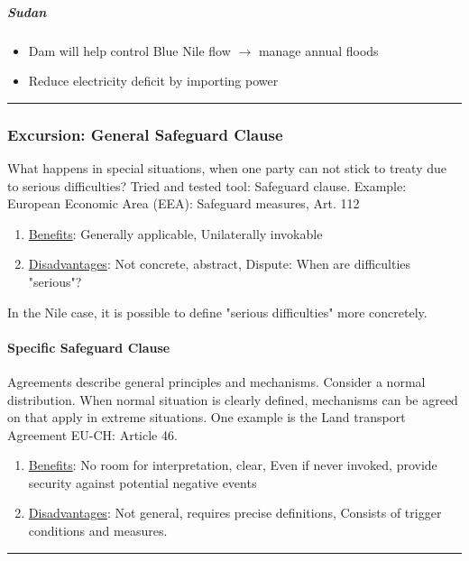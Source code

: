 \subparagraph{Sudan}
\begin{itemize}
    \item Dam will help control Blue Nile flow $\rightarrow$ manage annual floods
    \item Reduce electricity deficit by importing power
\end{itemize}

\pagebreak

\hrule

\subsubsection{Excursion: General Safeguard Clause}

What happens in special situations, when one party can not stick to treaty
due to serious difficulties? Tried and tested tool: Safeguard clause.
Example: European Economic Area (EEA): Safeguard measures, Art. 112

\begin{enumerate}[]
    \item \underline{Benefits}: Generally applicable, Unilaterally invokable
    \item \underline{Disadvantages}: Not concrete, abstract, Dispute: When are difficulties "serious"?
\end{enumerate}
In the Nile case, it is possible to define "serious difficulties" more concretely.

\paragraph{Specific Safeguard Clause}

Agreements describe general principles and mechanisms. Consider a normal
distribution. When normal situation is clearly defined, mechanisms can be
agreed on that apply in extreme situations.
One example is the Land transport Agreement EU-CH: Article 46.

\begin{enumerate}[]
    \item \underline{Benefits}: No room for interpretation, clear,
        Even if never invoked, provide security against potential negative
        events
    \item \underline{Disadvantages}: Not general, requires precise definitions,
        Consists of trigger conditions and measures.
\end{enumerate}

\hrule

